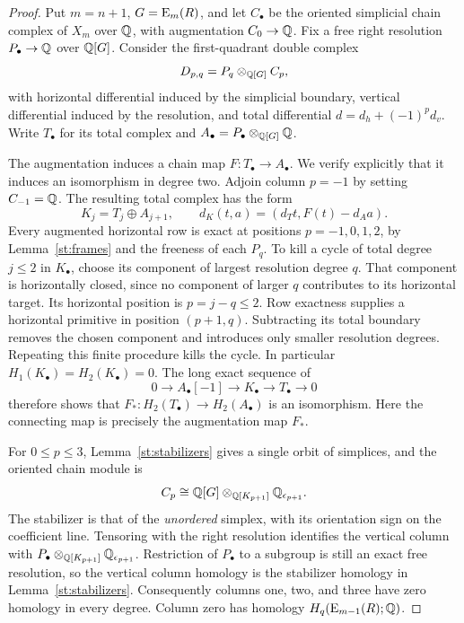 \begin{proof}
Put $m=n+1$, $G=\operatorname{E}_m(R)$, and let $C_\bullet$ be the oriented
simplicial chain complex of $X_m$ over $\mathbb Q$, with augmentation
$C_0\to\mathbb Q$. Fix a free right resolution $P_\bullet\to\mathbb Q$ over
$\mathbb Q[G]$. Consider the first-quadrant double complex
\[
 D_{p,q}=P_q\otimes_{\mathbb Q[G]}C_p,
\]
with horizontal differential induced by the simplicial boundary,
vertical differential induced by the resolution, and total
differential $d=d_h+(-1)^p d_v$. Write $T_\bullet$ for its total
complex and $A_\bullet=P_\bullet\otimes_{\mathbb Q[G]}\mathbb Q$.

The augmentation induces a chain map $F:T_\bullet\to A_\bullet$.
We verify explicitly that it induces an isomorphism in degree two.
Adjoin column $p=-1$ by setting $C_{-1}=\mathbb Q$. The resulting total
complex has the form
\[
 K_j=T_j\oplus A_{j+1},\qquad
 d_K(t,a)=(d_Tt,F(t)-d_Aa).
\]
Every augmented horizontal row is exact at positions
$p=-1,0,1,2$, by Lemma~\ref{st:frames} and the freeness of each
$P_q$. To kill a cycle of total degree $j\leq2$ in $K_\bullet$,
choose its component of largest resolution degree $q$. That
component is horizontally closed, since no component of larger
$q$ contributes to its horizontal target. Its horizontal position
is $p=j-q\leq2$. Row exactness supplies a horizontal primitive in
position $(p+1,q)$. Subtracting its total boundary removes the
chosen component and introduces only smaller resolution degrees.
Repeating this finite procedure kills the cycle. In particular
$H_1(K_\bullet)=H_2(K_\bullet)=0$. The long exact sequence of
\[
 0\longrightarrow A_\bullet[-1]
 \longrightarrow K_\bullet\longrightarrow T_\bullet
 \longrightarrow0
\]
therefore shows that $F_*:H_2(T_\bullet)\to H_2(A_\bullet)$ is
an isomorphism. Here the connecting map is precisely the
augmentation map $F_*$.

For $0\leq p\leq3$, Lemma~\ref{st:stabilizers} gives a single
orbit of simplices, and the oriented chain module is
\[
 C_p\cong\mathbb Q[G]\otimes_{\mathbb Q[K_{p+1}]}\mathbb Q_{\epsilon_{p+1}}.
\]
The stabilizer is that of the \emph{unordered} simplex, with its
orientation sign on the coefficient line. Tensoring with the right
resolution identifies the vertical column with
$P_\bullet\otimes_{\mathbb Q[K_{p+1}]}\mathbb Q_{\epsilon_{p+1}}$.
Restriction of $P_\bullet$ to a subgroup is still an exact free
resolution, so the vertical column homology is the stabilizer
homology in Lemma~\ref{st:stabilizers}. Consequently columns one,
two, and three have zero homology in every degree. Column zero
has homology $H_q(\operatorname{E}_{m-1}(R);\mathbb Q)$.


\end{proof}
